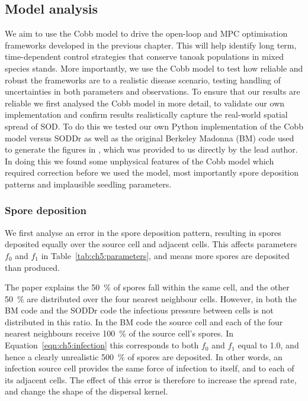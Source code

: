 \subsection{Model analysis\label{sec:ch5:model_analysis}}

We aim to use the Cobb model to drive the open-loop and MPC optimisation frameworks developed in the previous chapter. This will help identify long term, time-dependent control strategies that conserve tanoak populations in mixed species stands. More importantly, we use the Cobb model to test how reliable and robust the frameworks are to a realistic disease scenario, testing handling of uncertainties in both parameters and observations. To ensure that our results are reliable we first analysed the Cobb model in more detail, to validate our own implementation and confirm results realistically capture the real-world spatial spread of SOD\@. To do this we tested our own Python implementation of the Cobb model versus SODDr as well as the original Berkeley Madonna (BM) code used to generate the figures in \citet{cobb_ecosystem_2012}, which was provided to us directly by the lead author. In doing this we found some unphysical features of the Cobb model which required correction before we used the model, most importantly spore deposition patterns and implausible seedling parameters.

\subsubsection{Spore deposition}

We first analyse an error in the spore deposition pattern, resulting in spores deposited equally over the source cell and adjacent cells. This affects parameters $f_0$ and $f_1$ in Table~\ref{tab:ch5:parameters}, and means more spores are deposited than produced.

The paper explains the \SI{50}{\percent} of spores fall within the same cell, and the other \SI{50}{\percent} are distributed over the four nearest neighbour cells. However, in both the BM code and the SODDr code the infectious pressure between cells is not distributed in this ratio. In the BM code the source cell and each of the four nearest neighbours receive \SI{100}{\percent} of the source cell's spores. In Equation~\ref{eqn:ch5:infection} this corresponds to both $f_0$ and $f_1$ equal to \num{1.0}, and hence a clearly unrealistic \SI{500}{\percent} of spores are deposited. In other words, an infection source cell provides the same force of infection to itself, and to each of its adjacent cells. The effect of this error is therefore to increase the spread rate, and change the shape of the dispersal kernel.


